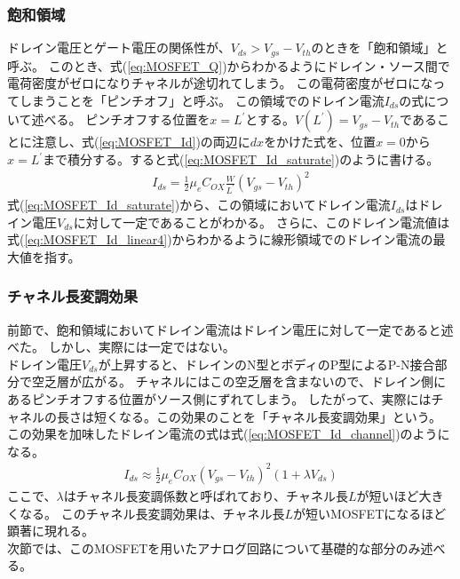 		\subsubsection{飽和領域}
			ドレイン電圧とゲート電圧の関係性が、$V_{ds} > V_{gs} - V_{th}$のときを「飽和領域」と呼ぶ。
			このとき、式(\ref{eq:MOSFET_Q})からわかるようにドレイン・ソース間で電荷密度がゼロになりチャネルが途切れてしまう。
			この電荷密度がゼロになってしまうことを「ピンチオフ」と呼ぶ。
			この領域でのドレイン電流$I_{ds}$の式について述べる。
			ピンチオフする位置を$x = L^{'}$とする。$V(L^{'}) = V_{gs} - V_{th}$であることに注意し、式(\ref{eq:MOSFET_Id})の両辺に$dx$をかけた式を、位置$x=0$から$x=L^{'}$まで積分する。すると式(\ref{eq:MOSFET_Id_saturate})のように書ける。
			\begin{eqnarray}
				I_{ds} = \frac{1}{2} \mu_e C_{OX} \frac{W}{L^{'}} {(V_{gs} - V_{th})}^2
				\label{eq:MOSFET_Id_saturate}
			\end{eqnarray}
			式(\ref{eq:MOSFET_Id_saturate})から、この領域においてドレイン電流$I_{ds}$はドレイン電圧$V_{ds}$に対して一定であることがわかる。
			さらに、このドレイン電流値は式(\ref{eq:MOSFET_Id_linear4})からわかるように線形領域でのドレイン電流の最大値を指す。\\
		\subsubsection{チャネル長変調効果}
			前節で、飽和領域においてドレイン電流はドレイン電圧に対して一定であると述べた。
			しかし、実際には一定ではない。\\
			ドレイン電圧$V_{ds}$が上昇すると、ドレインのN型とボディのP型によるP-N接合部分で空乏層が広がる。
			チャネルにはこの空乏層を含まないので、ドレイン側にあるピンチオフする位置がソース側にずれてしまう。
			したがって、実際にはチャネルの長さは短くなる。この効果のことを「チャネル長変調効果」という。\\
			この効果を加味したドレイン電流の式は式(\ref{eq:MOSFET_Id_channel})のようになる。
			\begin{eqnarray}
				I_{ds} \approx \frac{1}{2} \mu_e C_{OX} {(V_{gs} - V_{th})}^{2} (1 + \lambda V_{ds})
				\label{eq:MOSFET_Id_channel}
			\end{eqnarray}
			ここで、$\lambda$はチャネル長変調係数と呼ばれており、チャネル長$L$が短いほど大きくなる。
			このチャネル長変調効果は、チャネル長$L$が短いMOSFETになるほど顕著に現れる。\\
			次節では、このMOSFETを用いたアナログ回路について基礎的な部分のみ述べる。
		
